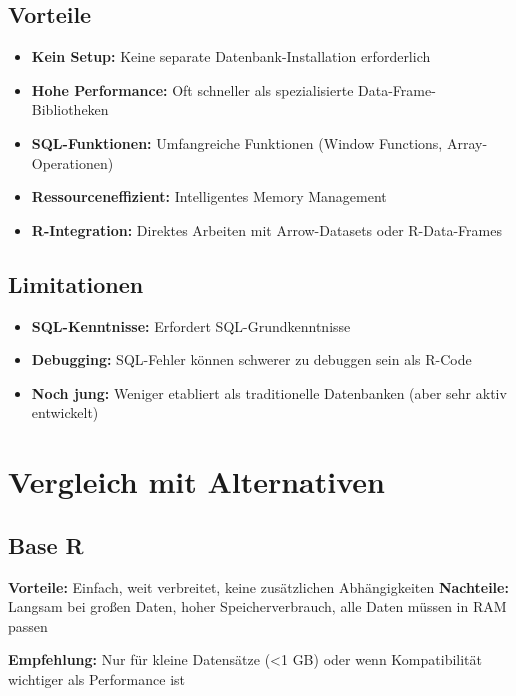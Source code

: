 \documentclass[
  ngerman,
  10pt,
  letterpaper,
  twocolumn]{book}
\providecommand{\tightlist}{%
  \setlength{\itemsep}{0pt}\setlength{\parskip}{0pt}}
\begin{document}
\subsection{Vorteile}\label{vorteile}

\begin{itemize}
\tightlist
\item
  \textbf{Kein Setup:} Keine separate Datenbank-Installation
  erforderlich
\item
  \textbf{Hohe Performance:} Oft schneller als spezialisierte
  Data-Frame-Bibliotheken
\item
  \textbf{SQL-Funktionen:} Umfangreiche Funktionen (Window Functions,
  Array-Operationen)
\item
  \textbf{Ressourceneffizient:} Intelligentes Memory Management
\item
  \textbf{R-Integration:} Direktes Arbeiten mit Arrow-Datasets oder
  R-Data-Frames
\end{itemize}

\subsection{Limitationen}\label{limitationen-1}

\begin{itemize}
\tightlist
\item
  \textbf{SQL-Kenntnisse:} Erfordert SQL-Grundkenntnisse
\item
  \textbf{Debugging:} SQL-Fehler können schwerer zu debuggen sein als
  R-Code
\item
  \textbf{Noch jung:} Weniger etabliert als traditionelle Datenbanken
  (aber sehr aktiv entwickelt)
\end{itemize}

\section{Vergleich mit Alternativen}\label{vergleich-mit-alternativen}

\subsection{Base R}\label{base-r}

\textbf{Vorteile:} Einfach, weit verbreitet, keine zusätzlichen
Abhängigkeiten \textbf{Nachteile:} Langsam bei großen Daten, hoher
Speicherverbrauch, alle Daten müssen in RAM passen

\textbf{Empfehlung:} Nur für kleine Datensätze (\textless1 GB) oder wenn
Kompatibilität wichtiger als Performance ist
\end{document}
